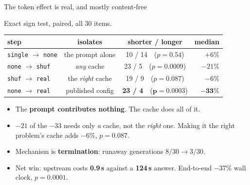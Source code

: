\documentclass[aspectratio=169]{beamer}
\begin{document}
\begin{frame}{The token effect is real, and mostly content-free}

Exact sign test, paired, all 30 items.

\begin{center}
\begin{tabular}{lccr}
\toprule
step & isolates & shorter / longer & median \\
\midrule
\texttt{single} $\to$ \texttt{none} & the prompt alone & 10 / 14\ \ ($p{=}0.54$) & $+6\%$ \\
\texttt{none} $\to$ \texttt{shuf}   & \emph{any} cache & 23 / 5\ \ ($p{=}0.0009$) & $-21\%$ \\
\texttt{shuf} $\to$ \texttt{real}   & the \emph{right} cache & 19 / 9\ \ ($p{=}0.087$) & $-6\%$ \\
\midrule
\texttt{none} $\to$ \texttt{real}   & published config & \textbf{23 / 4}\ \ ($\mathbf{p{=}0.0003}$) & $\mathbf{-33\%}$ \\
\bottomrule
\end{tabular}
\end{center}

\vspace{0.6em}
\begin{itemize}
  \item The \textbf{prompt contributes nothing}. The cache does all of it.
  \item $-21$ of the $-33$ needs only \emph{a} cache, not the \emph{right} one.
        Making it the right problem's cache adds $-6\%$, $p=0.087$.
  \item Mechanism is \textbf{termination}: runaway generations $8/30 \to 3/30$.
  \item Net win: upstream costs \textbf{0.9\,s} against a \textbf{124\,s} answer.
        End-to-end $-37\%$ wall clock, $p=0.0001$.
\end{itemize}

\end{frame}
\end{document}
